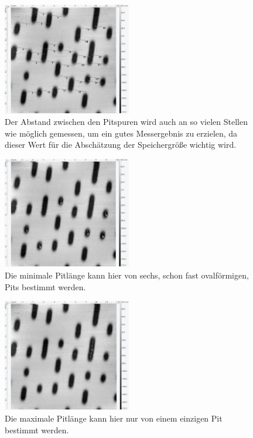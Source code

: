 %
\begin{figure}
\centering
	\includegraphics[width=0.5\textwidth]{AFM_auswertung/cd_abstand.png}
	\caption{Der Abstand zwischen den Pitspuren wird auch an so vielen Stellen wie m\"oglich gemessen, um ein gutes Messergebnis zu erzielen, da dieser Wert f\"ur die Absch\"atzung der Speichergr\"o{\ss}e wichtig wird.}
	\label{abb:cd_abstand}
\end{figure}
%
\begin{figure}
\centering
	\includegraphics[width=0.5\textwidth]{AFM_auswertung/cd_Lmin.png}
	\caption{Die minimale Pitl\"ange kann hier von sechs, schon fast ovalf\"ormigen, Pits bestimmt werden.}
	\label{abb:cd_abstand}
\end{figure}
%
\begin{figure}
\centering
	\includegraphics[width=0.5\textwidth]{AFM_auswertung/cd_Lmax.png}
	\caption{Die maximale Pitl\"ange kann hier nur von einem einzigen Pit bestimmt werden.}
	\label{abb:cd_laenge}
\end{figure}

